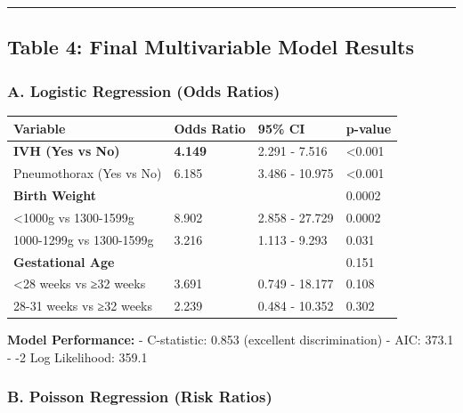 \documentclass[
]{article}
\begin{document}
\begin{center}\rule{0.5\linewidth}{0.5pt}\end{center}

\hypertarget{table-4-final-multivariable-model-results}{%
\subsection{Table 4: Final Multivariable Model
Results}\label{table-4-final-multivariable-model-results}}

\hypertarget{a.-logistic-regression-odds-ratios}{%
\subsubsection{A. Logistic Regression (Odds
Ratios)}\label{a.-logistic-regression-odds-ratios}}

\begin{longtable}[]{@{}llll@{}}
\toprule
Variable & Odds Ratio & 95\% CI & p-value \\
\midrule
\endhead
\textbf{IVH (Yes vs No)} & \textbf{4.149} & 2.291 - 7.516 &
\textless0.001 \\
Pneumothorax (Yes vs No) & 6.185 & 3.486 - 10.975 & \textless0.001 \\
\textbf{Birth Weight} & & & 0.0002 \\
\textless1000g vs 1300-1599g & 8.902 & 2.858 - 27.729 & 0.0002 \\
1000-1299g vs 1300-1599g & 3.216 & 1.113 - 9.293 & 0.031 \\
\textbf{Gestational Age} & & & 0.151 \\
\textless28 weeks vs ≥32 weeks & 3.691 & 0.749 - 18.177 & 0.108 \\
28-31 weeks vs ≥32 weeks & 2.239 & 0.484 - 10.352 & 0.302 \\
\bottomrule
\end{longtable}

\textbf{Model Performance:} - C-statistic: 0.853 (excellent
discrimination) - AIC: 373.1 - -2 Log Likelihood: 359.1

\hypertarget{b.-poisson-regression-risk-ratios}{%
\subsubsection{B. Poisson Regression (Risk
Ratios)}\label{b.-poisson-regression-risk-ratios}}
\end{document}
